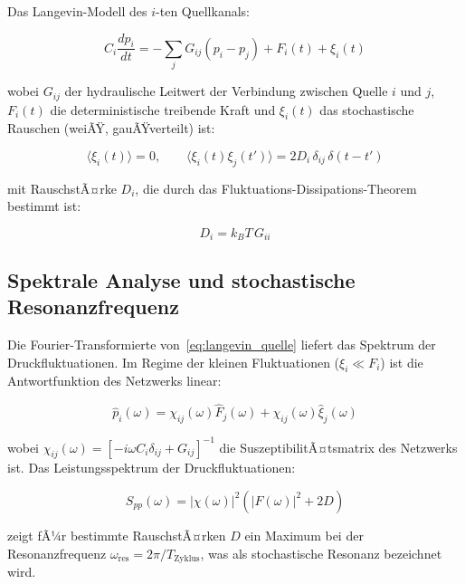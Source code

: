 ﻿\documentclass[12pt,a4paper]{report}
\begin{document}
Das Langevin-Modell des $i$-ten Quellkanals:

\begin{equation}
	C_i\frac{d p_i}{dt} = -\sum_j G_{ij}(p_i - p_j) + F_i(t) + \xi_i(t)
	\label{eq:langevin_quelle}
\end{equation}

wobei $G_{ij}$ der hydraulische Leitwert der Verbindung zwischen Quelle $i$ und $j$, $F_i(t)$ die deterministische treibende Kraft und $\xi_i(t)$ das stochastische Rauschen (weiÃŸ, gauÃŸverteilt) ist:

\begin{equation}
	\langle\xi_i(t)\rangle = 0, \qquad \langle\xi_i(t)\xi_j(t')\rangle = 2D_i\,\delta_{ij}\,\delta(t-t')
	\label{eq:rauschen_statistik}
\end{equation}

mit RauschstÃ¤rke $D_i$, die durch das Fluktuations-Dissipations-Theorem bestimmt ist:

\begin{equation}
	D_i = k_BT\,G_{ii}
	\label{eq:fdt}
\end{equation}

\subsection{Spektrale Analyse und stochastische Resonanzfrequenz}

Die Fourier-Transformierte von~\eqref{eq:langevin_quelle} liefert das Spektrum der Druckfluktuationen. Im Regime der kleinen Fluktuationen ($\xi_i \ll F_i$) ist die Antwortfunktion des Netzwerks linear:

\begin{equation}
	\hat{p}_i(\omega) = \chi_{ij}(\omega)\hat{F}_j(\omega) + \chi_{ij}(\omega)\hat{\xi}_j(\omega)
	\label{eq:antwortfunktion}
\end{equation}
		
wobei $\chi_{ij}(\omega) = [-i\omega C_i\delta_{ij} + G_{ij}]^{-1}$ die SuszeptibilitÃ¤tsmatrix des Netzwerks ist. Das Leistungsspektrum der Druckfluktuationen:

\begin{equation}
	S_{pp}(\omega) = |\chi(\omega)|^2\left(|F(\omega)|^2 + 2D\right)
	\label{eq:leistungsspektrum}
\end{equation}

zeigt fÃ¼r bestimmte RauschstÃ¤rken $D$ ein Maximum bei der Resonanzfrequenz $\omega_\mathrm{res} = 2\pi/T_\mathrm{Zyklus}$, was als stochastische Resonanz bezeichnet wird.
\end{document}
